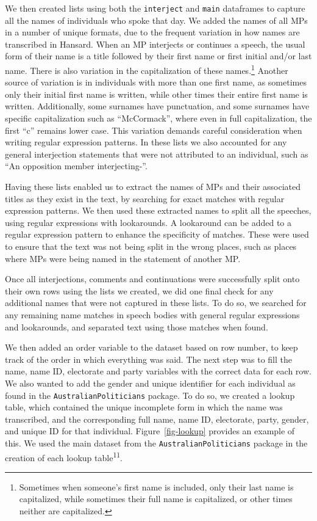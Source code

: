 \documentclass[
  letterpaper,
  DIV=11,
  numbers=noendperiod]{scrartcl}
\begin{document}
We then created lists using both the \texttt{interject} and
\texttt{main} dataframes to capture all the names of individuals who
spoke that day. We added the names of all MPs in a number of unique
formats, due to the frequent variation in how names are transcribed in
Hansard. When an MP interjects or continues a speech, the usual form of
their name is a title followed by their first name or first initial
and/or last name. There is also variation in the capitalization of these
names.\footnote{Sometimes when someone's first name is included, only
  their last name is capitalized, while sometimes their full name is
  capitalized, or other times neither are capitalized.} Another source
of variation is in individuals with more than one first name, as
sometimes only their initial first name is written, while other times
their entire first name is written. Additionally, some surnames have
punctuation, and some surnames have specific capitalization such as
``McCormack'', where even in full capitalization, the first ``c''
remains lower case. This variation demands careful consideration when
writing regular expression patterns. In these lists we also accounted
for any general interjection statements that were not attributed to an
individual, such as ``An opposition member interjecting-''.

Having these lists enabled us to extract the names of MPs and their
associated titles as they exist in the text, by searching for exact
matches with regular expression patterns. We then used these extracted
names to split all the speeches, using regular expressions with
lookarounds. A lookaround can be added to a regular expression pattern
to enhance the specificity of matches. These were used to ensure that
the text was not being split in the wrong places, such as places where
MPs were being named in the statement of another MP.

Once all interjections, comments and continuations were successfully
split onto their own rows using the lists we created, we did one final
check for any additional names that were not captured in these lists. To
do so, we searched for any remaining name matches in speech bodies with
general regular expressions and lookarounds, and separated text using
those matches when found.

We then added an order variable to the dataset based on row number, to
keep track of the order in which everything was said. The next step was
to fill the name, name ID, electorate and party variables with the
correct data for each row. We also wanted to add the gender and unique
identifier for each individual as found in the
\texttt{AustralianPoliticians} package. To do so, we created a lookup
table, which contained the unique incomplete form in which the name was
transcribed, and the corresponding full name, name ID, electorate,
party, gender, and unique ID for that individual.
Figure~\ref{fig-lookup} provides an example of this. We used the main
dataset from the \texttt{AustralianPoliticians} package in the creation
of each lookup table\textsuperscript{11}.
\end{document}
